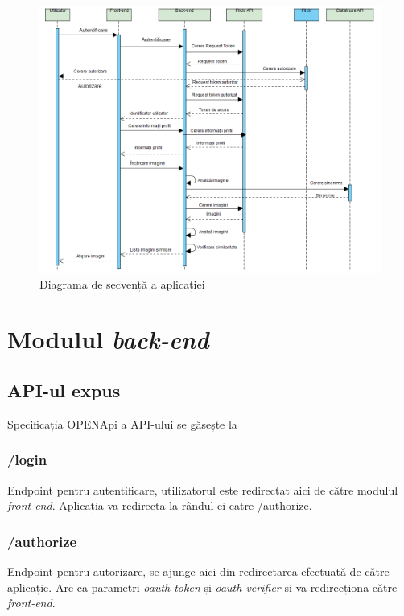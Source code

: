 \begin{figure}[!htbp]
    \begin{center}
        \includegraphics[width=1.0\textwidth]{images/secventa.png}
        \caption{Diagrama de secvență a aplicației}
    \end{center}
\end{figure}

\pagebreak
\section{Modulul \textit{back-end}}

\subsection{API-ul expus}
Specificația OPENApi a API-ului se găsește la ~
\subsubsection{/login}
Endpoint pentru autentificare, utilizatorul este redirectat aici de către modulul \textit{front-end}. Aplicația va redirecta la rândul ei catre /authorize.

\subsubsection{/authorize}
Endpoint pentru autorizare, se ajunge aici din redirectarea efectuată de către aplicație. Are ca parametri \textit{oauth-token} și \textit{oauth-verifier} și va redirecționa către \textit{front-end}.

